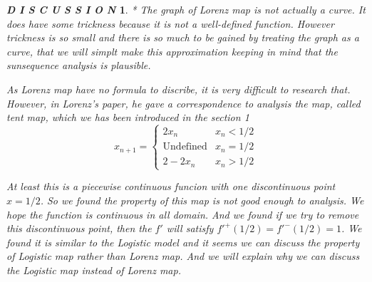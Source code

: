 \documentclass[12pt]{article}
\theoremstyle{plain}
\newtheorem{definition}{{\color{red}\textbf{Definition}}}[section]
\newtheorem{discussion}{\textit{D I S C U S S I O N}}[section]
\begin{document}
\begin{discussion}
* The graph of Lorenz map is not actually a curve. It does have some trickness because it is not a well-defined function. However trickness is so small and there is so much to be gained by treating the graph as a curve, that we will simplt make this approximation keeping in mind that the sunsequence analysis is plausible.









As Lorenz map have no formula to discribe, it is very difficult to research that. However, in Lorenz's paper, he gave a correspondence to analysis the map, called tent map, which we has been introduced in the section 1
$$
x_{n+1} = \left\{
\begin{array}{ll}
2x_n                & x_n < {1/2} \\
\text{Undefined}    & x_n = {1/2} \\
2 - 2x_n            & x_n > {1/2}
\end{array}
\right.
$$

At least this is a piecewise continuous funcion with one discontinuous point $x = 1/2$. So we found the property of this map is not good enough to analysis. We hope the function is continuous in all domain. And we found if we try to remove this discontinuous point, then the $f'$ will satisfy $f'^{+}(1/2) = f'^{-}(1/2) = 1$. We found it is similar to the Logistic model and it seems we can discuss the property of Logistic map rather than Lorenz map. And we will explain why we can discuss the Logistic map instead of Lorenz map.


\end{discussion}
\end{document}
